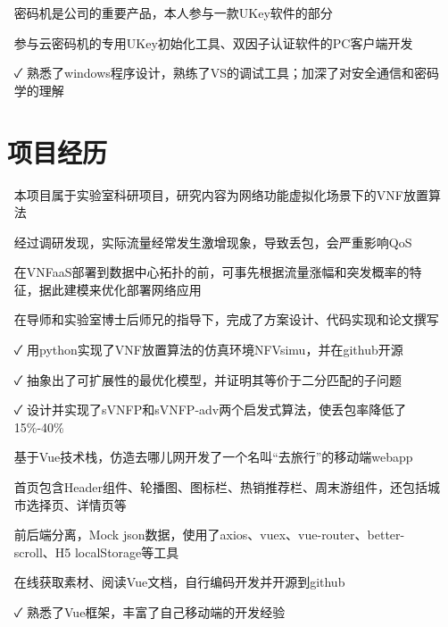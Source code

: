 \documentclass[14pt]{resume}
\begin{document}
\begin{itemize}
    \item[\faFlagO] 密码机是公司的重要产品，本人参与一款UKey软件的\textbf{\color{red}{windows开发}}部分
    \item[\faCode] 参与云密码机的专用UKey初始化工具、双因子认证软件的PC客户端开发
    \item[\faCheck] 熟悉了windows程序设计，熟练了VS的调试工具；加深了对安全通信和密码学的理解
\end{itemize}

\section{\faUsers\ 项目经历}

\begin{onehalfspacing}
\begin{itemize}
    \item[\faFlagO] 本项目属于实验室科研项目，研究内容为网络功能虚拟化场景下的VNF放置算法
    \item[\faFlagO] 经过调研发现，实际流量经常发生激增现象，导致丢包，会严重影响QoS
    \item[\faFlagO] 在VNFaaS部署到数据中心拓扑的前，可事先根据流量涨幅和突发概率的特征，据此建模来优化部署网络应用
    \item[\faCode] 在导师和实验室博士后师兄的指导下，完成了方案设计、代码实现和论文撰写
    \item[\faCheck] 用python实现了VNF放置算法的仿真环境NFVsimu，并在github开源
    \item[\faCheck] 抽象出了可扩展性的最优化模型，并证明其等价于二分匹配的子问题
    \item[\faCheck] 设计并实现了sVNFP和sVNFP-adv两个启发式算法，使丢包率降低了15\%-40\%
\end{itemize}
\end{onehalfspacing}

\begin{onehalfspacing}
\begin{itemize}
    \item[\faFlagO] 基于Vue技术栈，仿造去哪儿网开发了一个名叫“去旅行”的移动端webapp
    \item[\faFlagO] 首页包含Header组件、轮播图、图标栏、热销推荐栏、周末游组件，还包括城市选择页、详情页等
    \item[\faFlagO] 前后端分离，Mock json数据，使用了axios、vuex、vue-router、better-scroll、H5 localStorage等工具
    \item[\faCode] 在线获取素材、阅读Vue文档，自行编码开发并开源到github
    \item[\faCheck] 熟悉了Vue框架，丰富了自己移动端的开发经验
\end{itemize}
\end{onehalfspacing}
\end{document}
